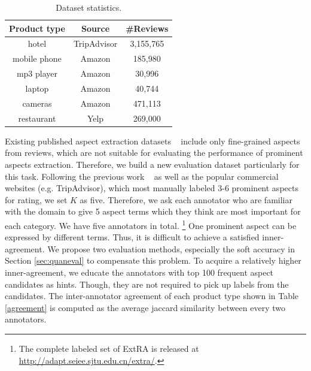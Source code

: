 \documentclass[11pt,a4paper]{article}
\newcommand{\secref}[1]{Section \ref{#1}}
\newcommand{\tabref}[1]{Table \ref{#1}}
\begin{document}
\begin{table}[th!]
	\small
	\centering
	\caption{Dataset statistics.} 
	\label{table:dataset}
	\begin{tabular}{|c|c|c|}
		\hline
		\textbf{Product type} & \textbf{Source} & \textbf{\#Reviews} \\ \hline \hline
		hotel        & TripAdvisor & 3,155,765   \\\hline
		mobile phone & Amazon & 185,980  \\\hline
		mp3 player   & Amazon & 30,996   \\\hline
		laptop       & Amazon & 40,744   \\\hline
		cameras & Amazon & 471,113  \\\hline
		restaurant   & Yelp & 269,000   \\\hline
	\end{tabular}
\end{table}

Existing published aspect extraction datasets ~\cite{hu2004mining,popescu2007extracting,pavlopoulos2014aspect,ding2008holistic} 
include only fine-grained aspects from reviews,
which are not suitable for evaluating the performance of 
prominent aspects extraction. 
Therefore, we build a new evaluation dataset particularly 
for this task.
Following the previous work 
~\cite{ganu2009beyond,brody2010unsupervised,zhao2010jointly,wang2015sentiment} as well as
the popular commercial websites (e.g. TripAdvisor), 
which most manually labeled 3-6 prominent aspects for
rating, we set $K$ as five.
Therefore,  
we ask each annotator who are familiar with the domain 
to give 5 aspect terms which they think are most important
for each category. We have five annotators in total.
\footnote{The 
	complete labeled set of ExtRA is released at \url{http://adapt.seiee.sjtu.edu.cn/extra/}.
}
One prominent aspect can be expressed by different terms.
Thus, it is difficult to achieve a satisfied inner-agreement.
We propose two evaluation methods, especially the 
soft accuracy in \secref{sec:quaneval} to compensate this problem.
To acquire a relatively higher inner-agreement, 
we educate the annotators with top 100 frequent aspect candidates
as hints. Though, they are not required to pick up labels from 
the candidates.
The inter-annotator agreement of each
product type shown in \tabref{agreement} is computed as the average jaccard similarity between every two annotators.
\end{document}
